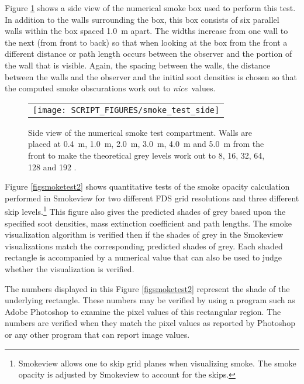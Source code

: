 \documentclass[11pt,twoside]{book}
\newcommand{\figoptions}{hbp}
\begin{document}
Figure \ref{figsmoketestgeom} shows a side view of the numerical smoke box used to perform this test.  In addition to the walls surrounding the box, this box consists of  six parallel walls within the box spaced 1.0~m apart.  The widths increase from one wall to the next (from front to back) so that when looking at the box from the front a different distance or path length occurs between the observer and the portion of the wall that is visible.  Again, the spacing between the walls, the distance between the walls and the observer and the initial soot densities is chosen so that the computed smoke obscurations work out to {\em nice}\ values.

\begin{figure}[\figoptions]
\begin{center}
 \centering
\begin{tabular}{c}
 \texttt{[image: SCRIPT\_FIGURES/smoke\_test\_side]}
 \end{tabular}
\end{center}
 \caption[Side view of numerical smoke test compartment.]{Side view of the numerical smoke test compartment.  Walls are placed at 0.4~m, 1.0~m, 2.0~m, 3.0~m, 4.0~m and 5.0~m from the front to make the theoretical grey levels work out to 8, 16, 32, 64, 128 and 192 .}
\label{figsmoketestgeom}%
\end{figure}

Figure \ref{figsmoketest2} shows quantitative tests of the smoke opacity calculation performed in Smokeview for two different FDS grid resolutions and three different skip levels.\footnote{Smokeview allows one to skip grid planes when visualizing smoke.  The smoke opacity is adjusted by Smokeview to account for the skips.} This figure also gives the predicted shades of grey based upon the specified soot densities, mass extinction coefficient and path lengths.  The smoke visualization algorithm is verified then if the shades of grey in the Smokeview visualizations match the corresponding predicted shades of grey.  Each shaded
rectangle is accompanied by a numerical value that can also be used to judge whether the visualization is verified.

The numbers displayed in this Figure \ref{figsmoketest2} represent the shade of the underlying rectangle.  These numbers may be verified by using a program such as Adobe Photoshop to examine the pixel values of this rectangular region.  The numbers are verified when they match the pixel values as reported by Photoshop or any other program that can report image values.
\end{document}
